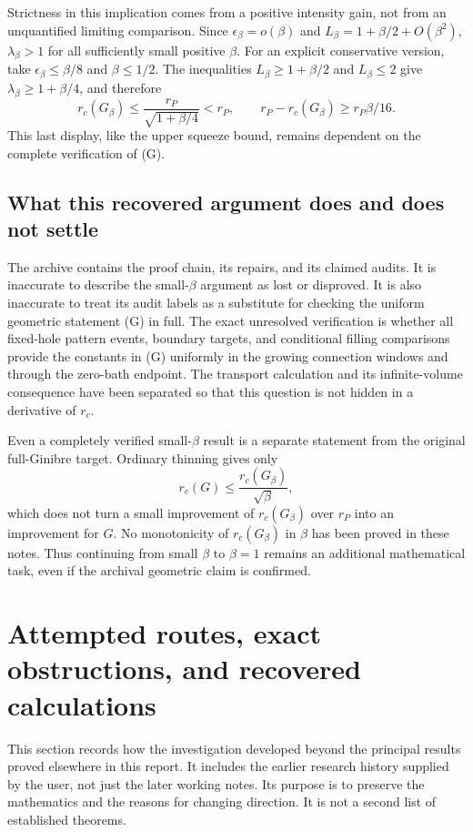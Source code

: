 \documentclass[11pt,a4paper]{article}
\theoremstyle{definition}
\theoremstyle{remark}
\numberwithin{equation}{section}
\begin{document}
Strictness in this implication comes from a positive intensity gain,
not from an unquantified limiting comparison. Since
$\epsilon_\beta=o(\beta)$ and $L_\beta=1+\beta/2+O(\beta^2)$,
$\lambda_\beta>1$ for all sufficiently small positive $\beta$.
For an explicit conservative version, take
$\epsilon_\beta\le\beta/8$ and $\beta\le1/2$. The inequalities
$L_\beta\ge1+\beta/2$ and $L_\beta\le2$ give
$\lambda_\beta\ge1+\beta/4$, and therefore
\[
 r_c(G_\beta)\le\frac{r_P}{\sqrt{1+\beta/4}}<r_P,
 \qquad r_P-r_c(G_\beta)\ge r_P\beta/16.
\]
This last display, like the upper squeeze bound, remains dependent on
the complete verification of (G).

\subsection{What this recovered argument does and does not settle}

The archive contains the proof chain, its repairs, and its claimed
audits. It is inaccurate to describe the small-$\beta$ argument as
lost or disproved. It is also inaccurate to treat its audit labels as
a substitute for checking the uniform geometric statement (G) in full.
The exact unresolved verification is whether all fixed-hole pattern
events, boundary targets, and conditional filling comparisons provide
the constants in (G) uniformly in the growing connection windows and
through the zero-bath endpoint. The transport calculation and its
infinite-volume consequence have been separated so that this question
is not hidden in a derivative of $r_c$.

Even a completely verified small-$\beta$ result is a separate statement
from the original full-Ginibre target. Ordinary thinning gives only
\[
 r_c(G)\le\frac{r_c(G_\beta)}{\sqrt\beta},
\]
which does not turn a small improvement of $r_c(G_\beta)$ over $r_P$
into an improvement for $G$. No monotonicity of $r_c(G_\beta)$ in
$\beta$ has been proved in these notes. Thus continuing from small
$\beta$ to $\beta=1$ remains an additional mathematical task, even if
the archival geometric claim is confirmed.


\section{Attempted routes, exact obstructions, and recovered calculations}
\label{br:investigation}

This section records how the investigation developed beyond the principal
results proved elsewhere in this report.  It includes the earlier research
history supplied by the user, not just the later working notes.  Its purpose
is to preserve the mathematics and the reasons for changing direction.
It is not a second list of established theorems.
\end{document}
